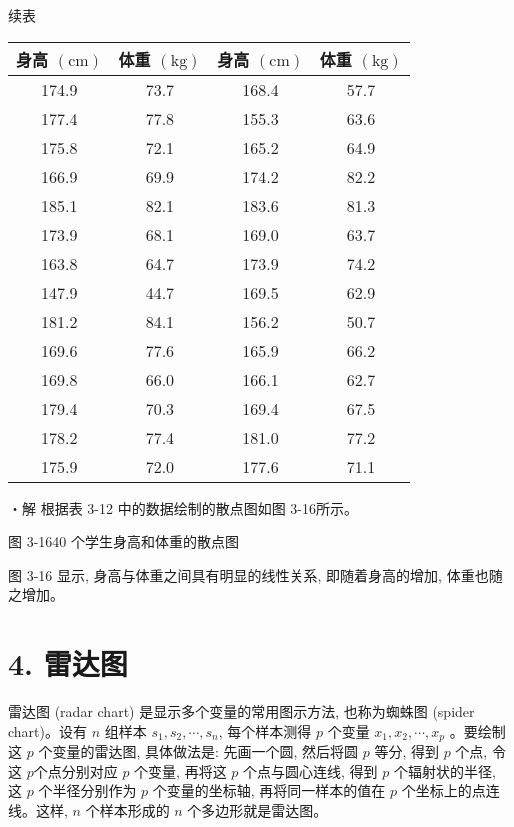 \documentclass[10pt]{article}
\begin{document}
\begin{CJK*}{UTF8}{bsmi}
续表

\begin{center}
\begin{tabular}{cc||cc}
\hline
身高 $(\mathrm{cm})$ & 体重 $(\mathrm{kg})$ & 身高 $(\mathrm{cm})$ & 体重 $(\mathrm{kg})$ \\
\hline
174.9 & 73.7 & 168.4 & 57.7 \\
177.4 & 77.8 & 155.3 & 63.6 \\
175.8 & 72.1 & 165.2 & 64.9 \\
166.9 & 69.9 & 174.2 & 82.2 \\
185.1 & 82.1 & 183.6 & 81.3 \\
173.9 & 68.1 & 169.0 & 63.7 \\
163.8 & 64.7 & 173.9 & 74.2 \\
147.9 & 44.7 & 169.5 & 62.9 \\
181.2 & 84.1 & 156.2 & 50.7 \\
169.6 & 77.6 & 165.9 & 66.2 \\
169.8 & 66.0 & 166.1 & 62.7 \\
179.4 & 70.3 & 169.4 & 67.5 \\
178.2 & 77.4 & 181.0 & 77.2 \\
175.9 & 72.0 & 177.6 & 71.1 \\
\hline
\end{tabular}
\end{center}

・解 根据表 3-12 中的数据绘制的散点图如图 3-16所示。

\begin{center}
\end{center}

图 3-1640 个学生身高和体重的散点图

图 3-16 显示, 身高与体重之间具有明显的线性关系, 即随着身高的增加, 体重也随之增加。

\section*{4. 雷达图}
雷达图 (radar chart) 是显示多个变量的常用图示方法, 也称为蜘蛛图 (spider chart)。设有 $n$ 组样本 $s_{1}, s_{2}, \cdots, s_{n}$, 每个样本测得 $p$ 个变量 $x_{1}, x_{2}, \cdots, x_{p}$ 。要绘制\\
这 $p$ 个变量的雷达图, 具体做法是: 先画一个圆, 然后将圆 $p$ 等分, 得到 $p$ 个点, 令这 $p$个点分别对应 $p$ 个变量, 再将这 $p$ 个点与圆心连线, 得到 $p$ 个辐射状的半径, 这 $p$ 个半径分别作为 $p$ 个变量的坐标轴, 再将同一样本的值在 $p$ 个坐标上的点连线。这样, $n$ 个样本形成的 $n$ 个多边形就是雷达图。


\end{CJK*}
\end{document}
